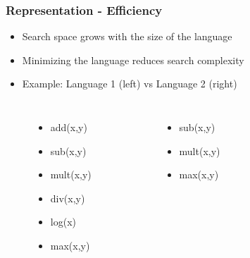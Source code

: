 \documentclass{beamer}
\begin{document}
\begin{frame}
\frametitle{Representation - Efficiency}
	
	\begin{itemize}
		\item Search space grows with the size of the language
		\item Minimizing the language reduces search complexity
		\item Example: Language 1 (left) vs Language 2 (right)
	\end{itemize}
	
\begin{columns}[c]
\begin{figure}
\begin{itemize}
		\item add(x,y)
		\item sub(x,y)
		\item mult(x,y)
		\item div(x,y)
		\item log(x)
		\item max(x,y)
\end{itemize}
\end{figure}

\begin{figure}
\begin{itemize}
		\item sub(x,y)
		\item mult(x,y)
		\item max(x,y)
\end{itemize}
\end{figure}
\end{columns}	

\end{frame}
\end{document}
